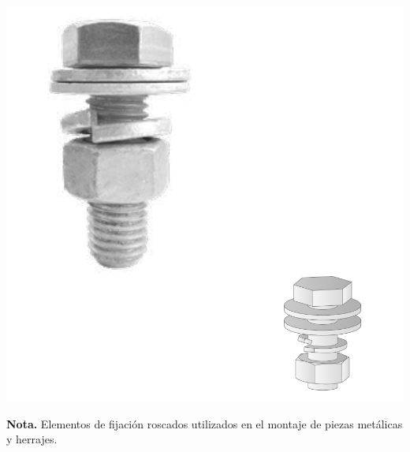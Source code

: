 \noindent
\begin{minipage}[t]{0.48\textwidth}
    \centering
    \includegraphics[width=\linewidth]{fotosherrajes/Pernos maquina.png}
    \footnotesize
    \raggedright
    \textbf{Nota.} Elementos de fijación roscados utilizados en el montaje de piezas metálicas y herrajes.
\end{minipage}%
\hfill
